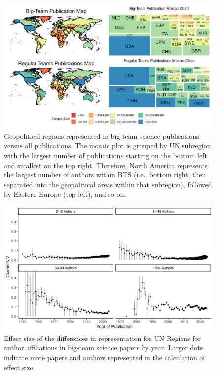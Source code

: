 \documentclass[
  man,floatsintext]{apa7}
\begin{document}
\begin{figure}
\includegraphics[width=1\linewidth]{figure/figure_6_map} \caption{Geopolitical regions represented in big-team science publications versus all publications. The mosaic plot is grouped by UN subregion with the largest number of publications starting on the bottom left and smallest on the top right. Therefore, North America represents the largest number of authors within BTS (i.e., bottom right, then separated into the geopolitical areas within that subregion), followed by Eastern Europe (top left), and so on.}\label{fig:fig-map-both}
\end{figure}

\begin{figure}
\includegraphics[width=1\linewidth]{figure/figure_8_author_effect_gpe} \caption{Effect size of the differences in representation for UN Regions for author affiliations in big-team science papers by year. Larger dots indicate more papers and authors represented in the calculation of effect size.}\label{fig:fig-effect-gpe}
\end{figure}
\end{document}
